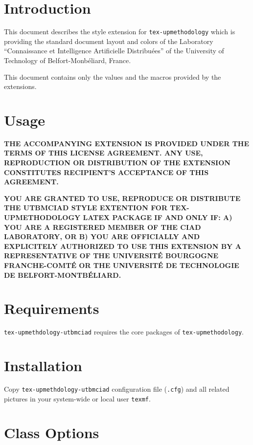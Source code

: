 \documentclass[article]{upmethodology-document}
\begin{document}
\section{Introduction}

This document describes the style extension for \texttt{tex-upmethodology} which is providing the standard document layout and colors of the Laboratory ``Connaissance et Intelligence Artificielle Distribu\'ees'' of the University of Technology of Belfort-Monb\'eliard, France.

This document contains only the values and the macros provided by the extensions.

\section{Usage}

\textbf{THE ACCOMPANYING EXTENSION IS PROVIDED UNDER THE TERMS OF THIS LICENSE AGREEMENT. ANY USE, REPRODUCTION OR DISTRIBUTION OF THE EXTENSION CONSTITUTES RECIPIENT'S ACCEPTANCE OF THIS AGREEMENT.}

\textbf{YOU ARE GRANTED TO USE, REPRODUCE OR DISTRIBUTE THE UTBMCIAD STYLE EXTENTION FOR TEX-UPMETHODOLOGY LATEX PACKAGE IF AND ONLY IF: A) YOU ARE A REGISTERED MEMBER OF THE CIAD LABORATORY, OR B) YOU ARE OFFICIALLY AND EXPLICITELY AUTHORIZED TO USE THIS EXTENSION BY A REPRESENTATIVE OF THE UNIVERSIT\'E BOURGOGNE FRANCHE-COMT\'E OR THE UNIVERSIT\'E DE TECHNOLOGIE DE BELFORT-MONTB\'ELIARD.}

\section{Requirements}

\texttt{tex-upmethdology-utbmciad} requires the core packages of \texttt{tex-upmethodology}.

\section{Installation}

Copy \texttt{tex-upmethdology-utbmciad} configuration file (\texttt{.cfg}) and all related pictures in your system-wide or local user \texttt{texmf}.

\section{Class Options}
\end{document}
